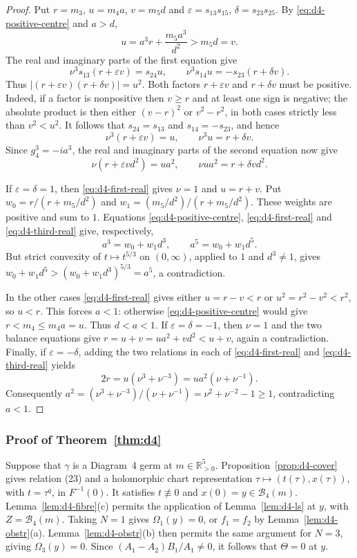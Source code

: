 \documentclass[Threeside,11pt]{article}
\theoremstyle{definition}
\theoremstyle{remark}
\numberwithin{equation}{section}
\theoremstyle{remark}
\newcommand{\Rp}{\mathbb{R}_{>0}}
\begin{document}
{\begin{proof}
Put $r=m_3$, $u=m_4a$, $v=m_5d$ and
$\varepsilon=s_{13}s_{15}$, $\delta=s_{23}s_{25}$.
By \eqref{eq:d4-positive-centre} and $a>d$,
\[
 u=a^3r+\frac{m_5a^3}{d^2}>m_5d=v.
\]
The real and imaginary parts of the first equation give
\[
 \nu^3s_{13}(r+\varepsilon v)=s_{24}u,
 \qquad \nu^3s_{14}u=-s_{23}(r+\delta v).
\]
Thus $|(r+\varepsilon v)(r+\delta v)|=u^2$.
Both factors $r+\varepsilon v$ and $r+\delta v$ must be positive.
Indeed, if a factor is nonpositive then $v\ge r$ and at least one sign
is negative; the absolute product is then either $(v-r)^2$ or
$v^2-r^2$, in both cases strictly less than $v^2<u^2$.
It follows that $s_{24}=s_{13}$ and $s_{14}=-s_{23}$, and hence
\begin{equation}\label{eq:d4-first-real}
 \nu^3(r+\varepsilon v)=u,\qquad
 \nu^3u=r+\delta v.
\end{equation}
Since $g_4^3=-ia^3$, the real and imaginary parts of the second equation
now give
\begin{equation}\label{eq:d4-third-real}
 \nu(r+\varepsilon vd^2)=ua^2,\qquad
 \nu ua^2=r+\delta vd^2.
\end{equation}

If $\varepsilon=\delta=1$, then \eqref{eq:d4-first-real} gives
$\nu=1$ and $u=r+v$.  Put
$w_0=r/(r+m_5/d^2)$ and $w_1=(m_5/d^2)/(r+m_5/d^2)$.
These weights are positive and sum to $1$.
Equations \eqref{eq:d4-positive-centre}, \eqref{eq:d4-first-real} and
\eqref{eq:d4-third-real} give, respectively,
\[
 a^3=w_0+w_1d^3,\qquad a^5=w_0+w_1d^5.
\]
But strict convexity of $t\mapsto t^{5/3}$ on $(0,\infty)$, applied
to $1$ and $d^3\ne1$, gives
$w_0+w_1d^5>(w_0+w_1d^3)^{5/3}=a^5$, a contradiction.

In the other cases \eqref{eq:d4-first-real} gives either
$u=r-v<r$ or $u^2=r^2-v^2<r^2$, so $u<r$.
This forces $a<1$: otherwise \eqref{eq:d4-positive-centre} would give
$r<m_4\le m_4a=u$.  Thus $d<a<1$.
If $\varepsilon=\delta=-1$, then $\nu=1$ and the two balance equations
give $r=u+v=ua^2+vd^2<u+v$, again a contradiction.
Finally, if $\varepsilon=-\delta$, adding the two relations in each
of \eqref{eq:d4-first-real} and \eqref{eq:d4-third-real} yields
\[
 2r=u(\nu^3+\nu^{-3})=ua^2(\nu+\nu^{-1}).
\]
Consequently
$a^2=(\nu^3+\nu^{-3})/(\nu+\nu^{-1})
=\nu^2+\nu^{-2}-1\ge1$, contradicting $a<1$.
\end{proof}

}\subsubsection{Proof of Theorem~\ref{thm:d4}}
{Suppose that $\gamma$ is a Diagram~4 germ at $m\in\Rp^5$.
Proposition~\ref{prop:d4-cover} gives relation (23) and a holomorphic chart representation
$\tau\mapsto(t(\tau),x(\tau))$, with $t=\tau^q$, in $F^{-1}(0)$.
It satisfies $t\not\equiv0$ and $x(0)=y\in\mathcal B_4(m)$.
Lemma~\ref{lem:d4-fibre}(c) permits the application of Lemma~\ref{lem:d4-ls} at $y$,
with $Z=\mathcal B_4(m)$. Taking $N=1$ gives $\Omega_1(y)=0$,
or $f_1=f_2$ by Lemma~\ref{lem:d4-obstr}(a).
Lemma~\ref{lem:d4-obstr}(b) then permits the same argument for $N=3$,
giving $\Omega_3(y)=0$. Since $(A_1-A_2)B_1/A_1\ne0$, it follows that $\Theta=0$ at $y$.}
\end{document}
